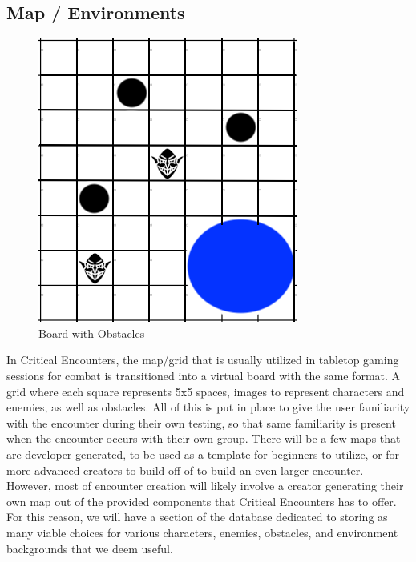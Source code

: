\documentclass[12pt,a4paper]{report}
\begin{document}
	\subsection{Map / Environments}
	\begin{figure}[H]
		\centering
		\includegraphics[scale=.6]{environment}
		\caption{Board with Obstacles}
		\label{fig: Board with Obstacles}
	\end{figure}
	In Critical Encounters, the map/grid that is usually utilized in tabletop gaming sessions for combat is transitioned into a virtual board with the same format. A grid where each square represents 5x5 spaces, images to represent characters and enemies, as well as obstacles. All of this is put in place to give the user familiarity with the encounter during their own testing, so that same familiarity is present when the encounter occurs with their own group. There will be a few maps that are developer-generated, to be used as a template for beginners to utilize, or for more advanced creators to build off of to build an even larger encounter. However, most of encounter creation will likely involve a creator generating their own map out of the provided components that Critical Encounters has to offer. For this reason, we will have a section of the database dedicated to storing as many viable choices for various characters, enemies, obstacles, and environment backgrounds that we deem useful.
	
	\newpage
\end{document}
